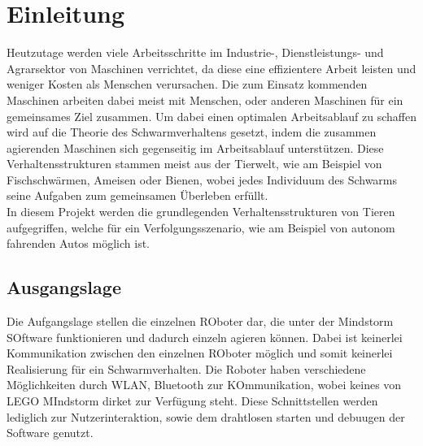 \setcounter{page}{1}
\ofoot{\pagemark}

\section{Einleitung}

Heutzutage werden viele Arbeitsschritte im Industrie-, Dienstleistungs- und Agrarsektor von Maschinen verrichtet, da diese eine effizientere Arbeit leisten und weniger Kosten als Menschen verursachen. Die zum Einsatz kommenden Maschinen arbeiten dabei meist mit Menschen, oder anderen Maschinen für ein gemeinsames Ziel zusammen. Um dabei einen optimalen Arbeitsablauf zu schaffen wird auf die Theorie des Schwarmverhaltens gesetzt, indem die zusammen agierenden Maschinen sich gegenseitig im Arbeitsablauf unterstützen. Diese Verhaltensstrukturen stammen meist aus der Tierwelt, wie am Beispiel von Fischschwärmen, Ameisen oder Bienen, wobei jedes Individuum des Schwarms seine Aufgaben zum gemeinsamen Überleben erfüllt.\\
In diesem Projekt werden die grundlegenden Verhaltensstrukturen von Tieren aufgegriffen, welche für ein Verfolgungsszenario, wie am Beispiel von autonom fahrenden Autos möglich ist.

\begin{comment}
Um den Ablauf der Arbeitsschritte, der zum Einsatz kommenden Maschinen zu optimieren, setzen viele auf ein Schwarmverhalten, welches eine Kommunikation

	In diesem Projekt werden diese Verhaltensmuster aus dem Tierreich aufgegriffen und anhand eines Verhaltensszenarios mit Kleinrobotern verwirklicht, die autonom agieren und kommunizieren, um zusammen ihr Ziel zu erreichen. Dabei sollen Konzepte, sowie Algorithmen für Schwarmroboter entstehen, die auch auf andere Szenarien angewendet werden können.\\
\end{comment}

\newpage
\subsection{Ausgangslage}

Die Aufgangslage stellen die einzelnen ROboter dar, die unter der Mindstorm SOftware funktionieren und dadurch einzeln agieren können. Dabei ist keinerlei Kommunikation zwischen den einzelnen ROboter möglich und somit keinerlei Realisierung für ein Schwarmverhalten. Die Roboter haben verschiedene Möglichkeiten durch WLAN, Bluetooth zur KOmmunikation, wobei keines von LEGO MIndstorm dirket zur Verfügung steht. Diese Schnittstellen werden lediglich zur Nutzerinteraktion, sowie dem drahtlosen starten und debuugen der Software genutzt.

